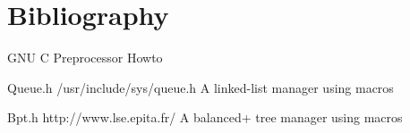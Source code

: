 %
%

\section{Bibliography}

\begin{thebibliography}{3}

    GNU C Preprocessor Howto

    Queue.h
    \newblock /usr/include/sys/queue.h
    \newblock A linked-list manager using macros

    Bpt.h
    \newblock http://www.lse.epita.fr/
    \newblock A balanced+ tree manager using macros
\end{thebibliography}


